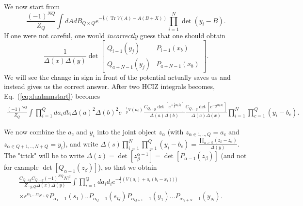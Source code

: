 \documentclass[english]{article}
\DeclareMathOperator{\Tr}{Tr}
\begin{document}
We now start from 
\begin{equation} \label{eq:dualmmstart}
    \frac{(-1)^{NQ}}{Z_{Q}}\int dA dB_{Q \times Q} e^{- \frac{1}{g} \left( \Tr V(A) - A(B+X) \right)} \prod_{i=1}^{N} \det(y_{i}-B).
\end{equation}
If one were not careful, one would \textit{incorrectly} guess that one should obtain
\begin{equation}
    \frac{1}{\Delta(x) \Delta(y)} \det \left[ \begin{array}{c|c} 
    Q_{i-1}(y_{j}) & P_{i-1}(x_{b}) \\ \hline
    Q_{a+N-1}(y_{j}) & P_{a+N-1}(x_{b}) 
    \end{array}\right].
\end{equation}
We will see the change in sign in front of the potential actually saves us and instead gives us the correct answer. After two HCIZ integrals becomes, Eq.~(\ref{eq:dualmmstart}) becomes
\begin{align}
    \frac{(-1)^{NQ}}{Z_{Q}}\int \prod_{i=1}^{Q} da_{i} db_{i} \Delta(a)^2 \Delta(b)^2 e^{-\frac{1}{g}V(a_{i})} \frac{C_{Q,+g}\det\left[ e^{+\frac{1}{g} a_{k}b_{l}} \right]}{\Delta(a)\Delta(b)} \frac{C_{Q,-g}\det\left[ e^{-\frac{1}{g} a_{k}x_{l}} \right]}{\Delta(a)\Delta(x)} \prod_{i=1}^{N} \prod_{c=1}^{Q} (y_{i}-b_{c}).
\end{align}

We now combine the $a_{c}$ and $y_{i}$ into the joint object $z_{\alpha}$ (with $z_{\alpha \in 1,..,Q}= a_{c}$ and $z_{\alpha \in Q+1,..,N+Q}= y_{i}$), and write $\Delta(s)\prod_{i=1}^{N} \prod_{=1}^{Q} (y_{i}-b_{c}) =  \frac{\prod_{\alpha <\beta} (z_{\beta}-z_{\alpha})}{\Delta(y)}$. 
The "trick" will be to write $\Delta(z)=\det\left[z_{\beta}^{\alpha-1}\right] = \det\left[ P_{\alpha-1}(z_{\beta})\right]$ (and not for example $\det \left[ Q_{\alpha-1}(z_{\beta}) \right]$),
so that we obtain 
\begin{align}
    \frac{C_{Q,+g}C_{Q,-g} (-1)^{NQ} N!^2}{Z_{-g,Q} \Delta(x) \Delta(y)}\int \prod_{i=1}^{Q} da_{i} d_{i} e^{-\frac{1}{g}\left(V(a_{i}) +a_{i}(b_{i}-x_{i}))\right)} & & \nonumber \\
    \times \epsilon^{\alpha_{1}...\alpha_{N+Q}} P_{\alpha_{1}-1}(s_{1})..P_{\alpha_{Q}-1}(s_{Q})P_{\alpha_{Q+1}-1}(y_1)...P_{\alpha_{Q+N}-1}(y_N).& &
\end{align}
\end{document}

